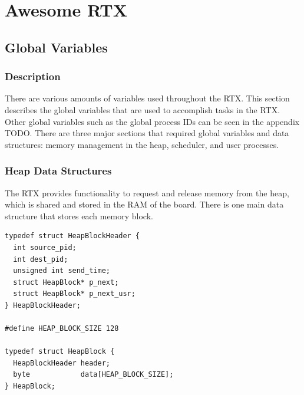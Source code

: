 \documentclass[12pt,twocolumn]{report}
\begin{document}
\part{Awesome RTX}

\chapter{Global Variables}
\section{Description}
There are various amounts of variables used throughout the RTX. This section describes the global variables that are used to accomplish tasks in the RTX. Other global variables such as the global process IDs can be seen in the appendix TODO. There are three major sections that required global variables and data structures: memory management in the heap, scheduler, and user processes.

\section{Heap Data Structures}
The RTX provides functionality to request and release memory from the heap, which is shared and stored in the RAM of the board. There is one main data structure that stores each memory block.

\begin{lstlisting}
typedef struct HeapBlockHeader {
  int source_pid;
  int dest_pid;
  unsigned int send_time;
  struct HeapBlock* p_next;
  struct HeapBlock* p_next_usr;
} HeapBlockHeader;

#define HEAP_BLOCK_SIZE 128

typedef struct HeapBlock {
  HeapBlockHeader header;
  byte            data[HEAP_BLOCK_SIZE];
} HeapBlock;

\end{lstlisting}
\end{document}
